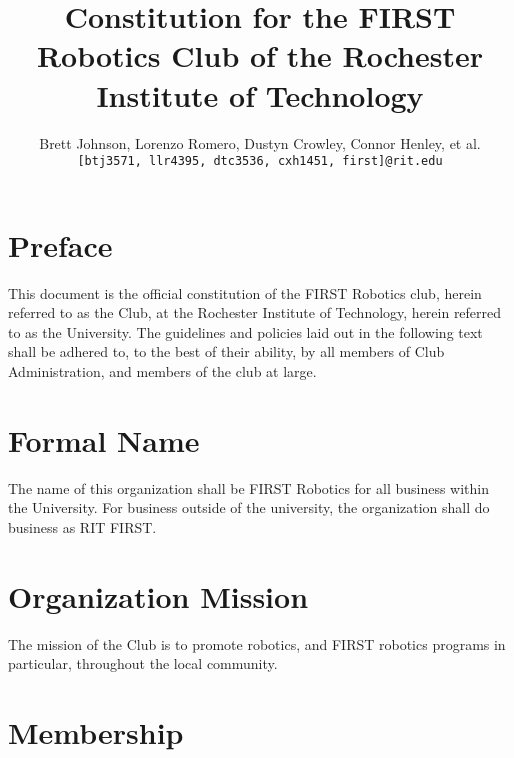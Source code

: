 \documentclass[english,11pt]{article}
\renewcommand{\footrulewidth}{1pt} %
\begin{document}
\title{Constitution for the FIRST Robotics Club of the Rochester Institute of Technology}
\author{
    Brett Johnson, Lorenzo Romero, Dustyn Crowley, Connor Henley, et al.  %
    \\    
    \texttt{[btj3571, llr4395, dtc3536, cxh1451, first]@rit.edu}
}
\date{} %

\fancypagestyle{plain}{
    \fancyhf{}
    \rfoot{\today}
    \renewcommand{\footrulewidth}{0pt} %
}

\maketitle
\newpage %


\section*{Preface}
This document is the official constitution of the FIRST Robotics club, herein referred to as the Club, at the Rochester Institute of Technology, herein referred to as the University.
The guidelines and policies laid out in the following text shall be adhered to, to the best of their ability, by all members of Club Administration, and members of the club at large.

\section{Formal Name}
The name of this organization shall be FIRST Robotics for all business within the University. 
For business outside of the university, the organization shall do business as RIT FIRST.

\section{Organization Mission}
The mission of the Club is to promote robotics, and FIRST robotics programs in particular, throughout the local community.

\section{Membership}
\end{document}
